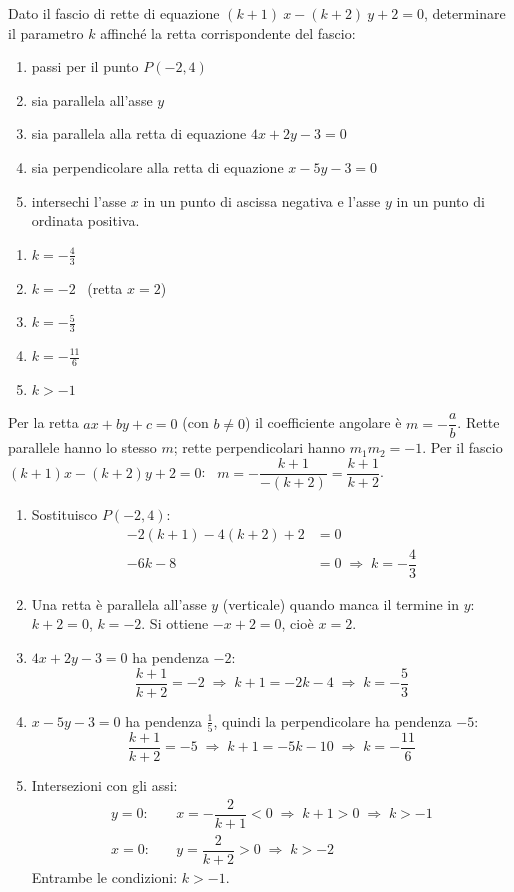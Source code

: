 \begin{question}[ID=1.3, subtitle={Fascio $(k+1)x-(k+2)y+2=0$: determinazione di $k$}, tags={fascio di rette}, difficulty=facile]
Dato il fascio di rette di equazione $(k+1) \ x - (k+2) \ y +2 = 0$, determinare il parametro $k$ affinché la retta corrispondente del fascio:
\begin{enumerate}
    \item passi per il punto $P(-2,4)$
    \item sia parallela all'asse $y$
    \item sia parallela alla retta di equazione $4x+2y-3=0$
    \item sia perpendicolare alla retta di equazione $x-5y-3=0$
    \item intersechi l'asse $x$ in un punto di ascissa negativa e l'asse $y$ in un punto di ordinata positiva.
\end{enumerate}
\begin{solution}
\begin{enumerate}
    \item $k=-\tfrac43$
    \item $k=-2$ \ (retta $x=2$)
    \item $k=-\tfrac53$
    \item $k=-\tfrac{11}{6}$
    \item $k>-1$
\end{enumerate}
\end{solution}
\begin{explanation}
Per la retta $ax+by+c=0$ (con $b\neq0$) il coefficiente angolare è $m=-\dfrac ab$. Rette parallele hanno lo stesso $m$; rette perpendicolari hanno $m_1m_2=-1$.
Per il fascio $(k+1)x-(k+2)y+2=0$: \ $m=-\dfrac{k+1}{-(k+2)}=\dfrac{k+1}{k+2}$.
\begin{enumerate}
    \item Sostituisco $P(-2,4)$:
    \[\begin{aligned}
    -2(k+1)-4(k+2)+2 &= 0\\
    -6k-8 &= 0 \;\Rightarrow\; k=-\dfrac43
    \end{aligned}\]
    \item Una retta è parallela all'asse $y$ (verticale) quando manca il termine in $y$: $k+2=0$, $k=-2$. Si ottiene $-x+2=0$, cioè $x=2$.
    \item $4x+2y-3=0$ ha pendenza $-2$:
    \[ \dfrac{k+1}{k+2}=-2 \;\Rightarrow\; k+1=-2k-4 \;\Rightarrow\; k=-\dfrac53 \]
    \item $x-5y-3=0$ ha pendenza $\tfrac15$, quindi la perpendicolare ha pendenza $-5$:
    \[ \dfrac{k+1}{k+2}=-5 \;\Rightarrow\; k+1=-5k-10 \;\Rightarrow\; k=-\dfrac{11}{6} \]
    \item Intersezioni con gli assi:
    \[\begin{aligned}
    y=0: &\quad x=-\dfrac{2}{k+1}<0 \;\Rightarrow\; k+1>0 \;\Rightarrow\; k>-1\\
    x=0: &\quad y=\dfrac{2}{k+2}>0 \;\Rightarrow\; k>-2
    \end{aligned}\]
    Entrambe le condizioni: $k>-1$.
\end{enumerate}
\end{explanation}
\end{question}


